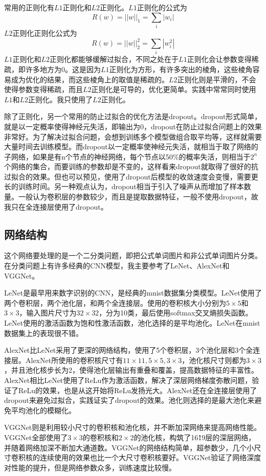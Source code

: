 \documentclass[12pt]{article}
\begin{document}
常用的正则化有$L1$正则化和$L2$正则化。$L1$正则化的公式为
$$R(w) = ||w||_1 = \sum_i|w_i|$$
$L2$正则化正则化公式为
$$R(w) = ||w||_2^2 = \sum_i|w_i^2|$$
$L1$正则化和$L2$正则化都能够缓解过拟合，不同之处在于$L1$正则化会让参数变得稀疏，即许多地方为0。这是因为$L1$正则化为方形，有许多突出的棱角，这些棱角容易成为优化的结果，而这些棱角上的取值是稀疏的。$L2$正则化则是平滑的，不会使得参数变得稀疏，而且$L2$正则化是可导的，优化更简单。实践中常常同时使用$L1$和$L2$正则化。我只使用了$L2$正则化。

除了正则化，另一个常用的防止过拟合的优化方法是dropout。\cite{dropout}dropout形式简单，就是以一定概率使得神经元失活，即输出为0，dropout在防止过拟合问题上的效果非常好。为了解决过拟合问题，会想到训练多个模型做组合取平均等，这样就需要大量时间去训练模型。而dropout以一定概率使神经元失活，就相当于取了网络的子网络，如果是有n个节点的神经网络，每个节点以50\%的概率失活，则相当于$2^n$个网络的集合，而要训练的参数却是不变的，这样看来dropout就取得了很好的抗过拟合的效果。但也可以预见，使用了dropout后模型的收敛速度会变慢，需要更长的训练时间。另一种观点认为，dropout相当于引入了噪声从而增加了样本数量。一般认为卷积层的参数较少，而且是提取数据特征，一般不使用dropout，故我只在全连接层使用了dropout。

\subsection{网络结构}
\noindent

这个网络要处理的是一个二分类问题，即把公式单词图片和非公式单词图片分类。在分类问题上有许多经典的CNN模型，我主要参考了LeNet、AlexNet和VGGNet。

LeNet是最早用来数字识别的CNN，是经典的mnist数据集分类模型。LeNet使用了两个卷积层，两个池化层，和两个全连接层。使用的卷积核大小分别为$5 \times 5$和$3 \times 3$，输入图片尺寸为$32 \times 32$，分为10类，最后使用softmax交叉熵损失函数。LeNet使用的激活函数为饱和性激活函数，池化选择的是平均池化。LeNet在mnist数据集上的表现很不错。

AlexNet比LeNet采用了更深的网络结构，使用了5个卷积层，3个池化层和3个全连接层。AlexNet所使用的卷积核尺寸有$11 \times 11, 5 \times 5, 3 \times 3$，池化核尺寸则都为$3 \times 3$，并且池化核步长为2，使得池化层输出有重叠和覆盖，提高数据特征的丰富性。AlexNet相比LeNet使用了ReLu作为激活函数，解决了深层网络梯度弥散问题，验证了ReLu的效果，也是从这开始将ReLu发扬光大。AlexNet还在全连接层使用了dropout来避免过拟合，实践证实了dropout的效果。池化则选择的是最大池化来避免平均池化的模糊化。

VGGNet则是利用较小尺寸的卷积核和池化核，并不断加深网络来提高网络性能。VGGNet全部使用了$3 \times 3$的卷积核和$2 \times 2$的池化核，构筑了16\~19层的深层网络，并随着网络加深不断加大通道数。VGGNet的网络结构简单，超参数少，几个小尺寸卷积核的连续使用的效果也比一个大尺寸卷积核要好。VGGNet验证了网络深度对性能的提升，但是网络参数众多，训练速度比较慢。
\end{document}
